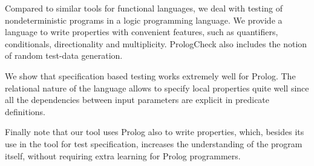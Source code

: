 \documentclass[runningheads,a4paper]{../../PaperStyles/llncs}
\newcommand{\Prolog}[0]{{\sf Prolog}}
\newcommand{\Haskell}[0]{{\sf Haskell}}
\newcommand{\QuickCheck}[0]{{\sf QuickCheck}}
\newcommand{\plqc}[0]{{\sf PrologCheck}}
\begin{document}
Compared to similar tools for functional languages, we deal with testing
of nondeterministic programs in a logic programming language.
%
We provide a language to write properties with convenient features,
such as quantifiers, conditionals, directionality and multiplicity.
%
\plqc{} also includes the notion of random test-data generation.
%


We show that specification based testing works extremely well for
\Prolog.
%
The relational nature of the language allows to specify local properties
quite well since all the dependencies between input parameters are explicit in
predicate definitions.


Finally note that our tool uses \Prolog{} also to write properties, which,
besides its use in the tool for test specification, increases the
understanding of the program itself, without requiring extra learning for
\Prolog{} programmers.




\end{document}
